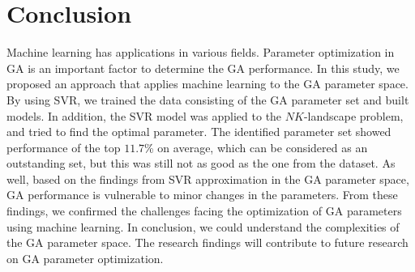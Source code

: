 \section{Conclusion}
  \label{sec:conclusion}
  Machine learning has applications in various fields. Parameter optimization in GA is an important factor to determine the GA performance. In this study, we proposed an approach that applies machine learning to the GA parameter space. By using SVR, we trained the data consisting of the GA parameter set and built models. In addition, the SVR model was applied to the $NK$-landscape problem, and tried to find the optimal parameter. The identified parameter set showed performance of the top $11.7$\% on average, which can be considered as an outstanding set, but this was still not as good as the one from the dataset. As well, based on the findings from SVR approximation in the GA parameter space, GA performance is vulnerable to minor changes in the parameters. From these findings, we confirmed the challenges facing the optimization of GA parameters using machine learning. In conclusion, we could understand the complexities of the GA parameter space. The research findings will contribute to future research on GA parameter optimization.
